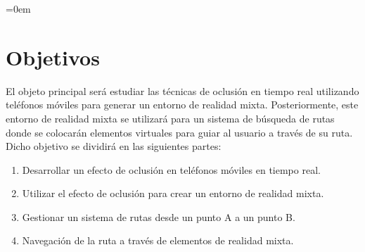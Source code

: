 \parindent=0em

\section{Objetivos}
\noindent

El objeto principal será estudiar las técnicas de oclusión en tiempo real utilizando teléfonos móviles para generar un entorno de realidad mixta. Posteriormente, este entorno de realidad mixta se utilizará para un sistema de búsqueda de rutas donde se colocarán elementos virtuales para guiar al usuario a través de su ruta.\\

Dicho objetivo se dividirá en las siguientes partes:

\begin{enumerate}[label=\arabic*)]
    \item Desarrollar un efecto de oclusión en teléfonos móviles en tiempo real.
    \item Utilizar el efecto de oclusión para crear un entorno de realidad mixta.
    \item Gestionar un sistema de rutas desde un punto A a un punto B.
    \item Navegación de la ruta a través de elementos de realidad mixta.
\end{enumerate}










